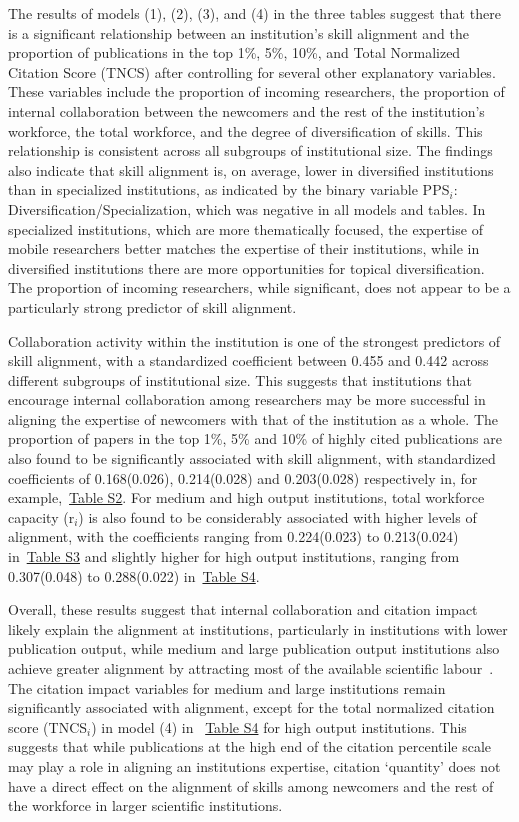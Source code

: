 \documentclass[draft,final]{vutinfth} %
\begin{document}
The results of models (1), (2), (3), and (4) in the three tables suggest that there is a significant relationship between an institution's skill alignment and the proportion of publications in the top 1\%, 5\%, 10\%, and Total Normalized Citation Score (TNCS) after controlling for several other explanatory variables. These variables include the proportion of incoming researchers, the proportion of internal collaboration between the newcomers and the rest of the institution's workforce, the total workforce, and the degree of diversification of skills. This relationship is consistent across all subgroups of institutional size. The findings also indicate that skill alignment is, on average, lower in diversified institutions than in specialized institutions, as indicated by the binary variable PPS$_{i}$: Diversification/Specialization, which was negative in all models and tables. In specialized institutions, which are more thematically focused, the expertise of mobile researchers better matches the expertise of their institutions, while in diversified institutions there are more opportunities for topical diversification. The proportion of incoming researchers, while significant, does not appear to be a particularly strong predictor of skill alignment.

Collaboration activity within the institution is one of the strongest predictors of skill alignment, with a standardized coefficient between 0.455 and 0.442 across different subgroups of institutional size. This suggests that institutions that encourage internal collaboration among researchers may be more successful in aligning the expertise of newcomers with that of the institution as a whole. The proportion of papers in the top 1\%, 5\% and 10\% of highly cited publications are also found to be significantly associated with skill alignment, with standardized coefficients of 0.168(0.026), 0.214(0.028) and 0.203(0.028) respectively in, for example,~\hyperref[Table S2]{Table S2}. For medium and high output institutions, total workforce capacity (r$_{i}$) is also found to be considerably associated with higher levels of alignment, with the coefficients ranging from 0.224(0.023) to 0.213(0.024) in~\hyperref[Table S3]{Table S3} and slightly higher for high output institutions, ranging from 0.307(0.048) to 0.288(0.022) in~\hyperref[Table S4]{Table S4}.

Overall, these results suggest that internal collaboration and citation impact likely explain the alignment at institutions, particularly in institutions with lower publication output, while medium and large publication output institutions also achieve greater alignment by attracting most of the available scientific labour~\cite{Zhang22}. The citation impact variables for medium and large institutions remain significantly associated with alignment, except for the total normalized citation score (TNCS$_{i}$) in model (4) in ~\hyperref[Table S4]{Table S4} for high output institutions. This suggests that while publications at the high end of the citation percentile scale may play a role in aligning an institutions expertise, citation `quantity' does not have a direct effect on the alignment of skills among newcomers and the rest of the workforce in larger scientific institutions. 
\end{document}

